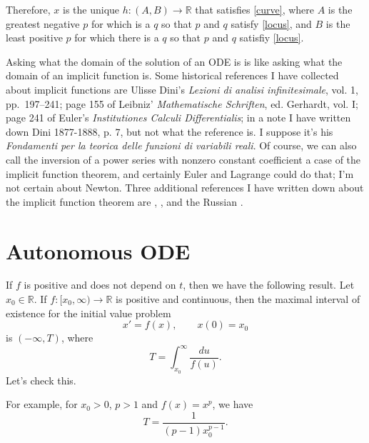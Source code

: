 \documentclass{article}
\theoremstyle{definition}
\begin{document}
Therefore, $x$ is the unique $h:(A,B) \to \mathbb{R}$ that satisfies  \eqref{curve}, where $A$ is the greatest negative $p$ for which is a $q$ so that $p$ and $q$ satisfy \eqref{locus},
and  $B$ is the least positive $p$ for which there is a $q$ so that $p$ and $q$ satisfiy \eqref{locus}.

Asking what the domain of the solution of an ODE is is like asking what the domain of an implicit function is. Some historical references
I have collected about implicit functions are Ulisse Dini's {\em Lezioni di analisi infinitesimale}, vol. 1, pp.~197--241;
page 155 of Leibniz'  {\em Mathematische Schriften}, ed. Gerhardt, vol. I;
page 241 of Euler's {\em Institutiones Calculi Differentialis}; in a note I have written down Dini 1877-1888, p. 7, but not what the reference is.
I suppose it's his {\em Fondamenti per la teorica delle funzioni di variabili reali}. Of course, we can also call the inversion of a power series
with nonzero constant coefficient a case of the implicit function theorem, and certainly Euler and Lagrange could do that; I'm not certain about Newton.
Three additional references I have written down about the implicit function theorem are \cite{MR0226976}, 
\cite{MR762062}, and the Russian \cite{MR1046939}.



\section{Autonomous ODE}
If $f$ is positive and does not depend on $t$, then we have the following result. Let
$x_0 \in \mathbb{R}$. If $f:[x_0,\infty) \to \mathbb{R}$ is positive and continuous, then the maximal interval of existence for the initial
value problem
\[
x'=f(x), \qquad x(0)=x_0
\]
is $(-\infty,T)$, where
\[
T=\int_{x_0}^\infty \frac{du}{f(u)}.
\]
Let's check this. 

For example, for $x_0>0$, $p>1$ and $f(x)=x^p$, we have 
\[
T=\frac{1}{(p-1)x_0^{p-1}}.
\]




\end{document}
